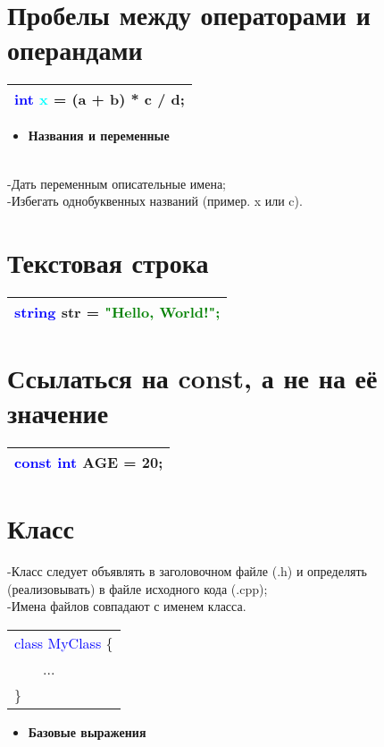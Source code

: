 \documentclass[12pt, letterpaper]{article}
\begin{document}
\section{Пробелы между операторами и операндами}
\begin{flushleft}
\begin{tabular}{ |l| } 
 \hline
\textcolor{blue}{int} \textcolor{cyan}{x }= (a + b) * c / d; \\
 \hline
\end{tabular}
\end{flushleft}
\begin{itemize}
\vspace*{10mm}
\hline
    \item \Large\textbf{Названия и переменные}
\end{itemize}
\\-Дать переменным описательные имена;
\\-Избегать однобуквенных названий (пример. x или c).
\setcounter{section}{0}
\section{Текстовая строка}
\begin{flushleft}
\begin{tabular}{ |l| } 
 \hline
\textcolor{blue}{string} str = \textcolor{green}{"Hello, World!";} \\
\hline
\end{tabular}
\end{flushleft}
\section{Ссылаться на const, а не на её значение}
\begin{flushleft}
\begin{tabular}{ |l| } 
\hline
    \textcolor{blue}{const int} AGE = 20;\\
\hline
\end{tabular}
\end{flushleft}
\section{Класс}
-Класс следует объявлять в заголовочном файле (.h) и определять (реализовывать) в файле исходного кода (.cpp);\\
-Имена файлов совпадают с именем класса.\\
\begin{flushleft}
\begin{tabular}{ |l| } 
\hline
\textcolor{blue}{class MyClass }\{\\
\ \ \ \   ...\\
\}\\
\hline
\end{tabular}
\end{flushleft}
    \begin{itemize}
\vspace*{10mm}
\hline
    \item \Large\textbf{Базовые выражения}
\end{itemize}
\setcounter{section}{0}
\end{document}
